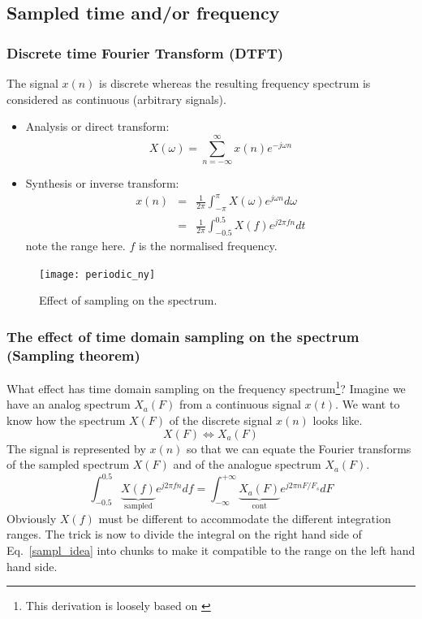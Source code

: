 \documentclass[12pt,a4paper]{article}
\begin{document}
\subsection{Sampled time and/or frequency}

\subsubsection{Discrete time Fourier Transform (DTFT)}

The signal $x(n)$ is discrete whereas the resulting frequency
spectrum is considered as continuous (arbitrary signals).

\begin{itemize}
\item Analysis or direct transform:
\begin{equation}
X(\omega)=\sum_{n=-\infty}^{\infty} x(n) e^{-j\omega n}
\end{equation}

\item Synthesis or inverse transform:
\begin{eqnarray}
x(n) & = & \frac{1}{2\pi} \int_{-\pi}^{\pi} X(\omega) e^{j\omega n} d\omega \\
     & = & \frac{1}{2\pi} \int_{-0.5}^{0.5} X(f) e^{j 2\pi f n} dt
\end{eqnarray}
note the range here. $f$ is the normalised frequency.

\end{itemize}


\begin{figure}[!hbt]
\begin{center}
\mbox{\texttt{[image: periodic\_ny]}}
\end{center}
\caption{Effect of sampling on the spectrum.
\label{periodic_ny}}
\end{figure}


\subsubsection{The effect of time domain sampling on the spectrum (Sampling
theorem)}
What effect has time domain sampling on the frequency spectrum\footnote{This derivation is loosely based on \citet{Proakis1996}}? Imagine we
have an analog spectrum $X_a(F)$ from a continuous signal $x(t)$. We want
to know how the spectrum $X(F)$ of the discrete signal $x(n)$ looks like.
\begin{equation}
X(F) \Leftrightarrow X_a(F)
\end{equation}
The signal is represented by $x(n)$ so that
we can equate the Fourier transforms of the sampled spectrum $X(F)$ and
of the analogue spectrum $X_a(F)$. 
\begin{equation}
\int_{-0.5}^{0.5} \underbrace{X(f)}_{\mbox{sampled}} e^{j 2 \pi f n} df = 
\int_{-\infty}^{+\infty} \underbrace{X_a(F)}_{\mbox{cont}} e^{j 2\pi n F/F_s} dF
\label{sampl_idea}
\end{equation}
Obviously $X(f)$ must be different to accommodate the different integration
ranges. The trick is now to divide the integral on the right hand side 
of Eq.~\ref{sampl_idea} 
into chunks to make it compatible to the range on the left hand
hand side.
\end{document}
